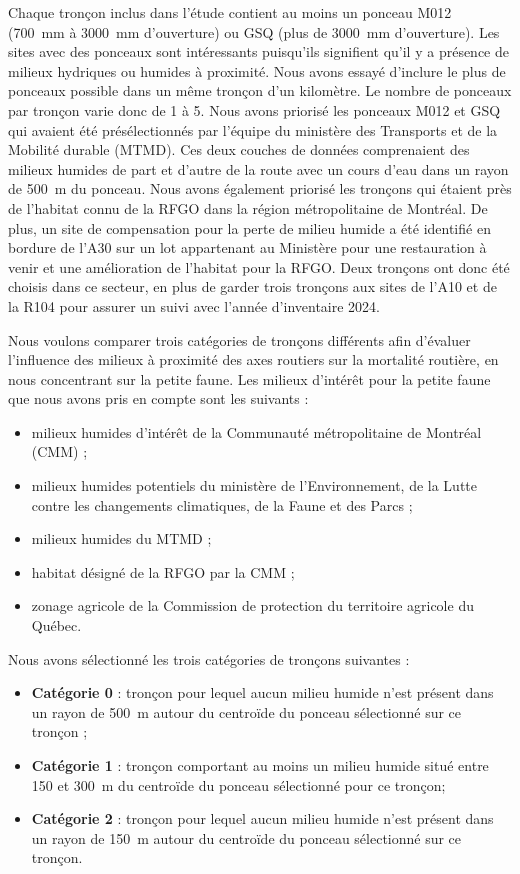 Chaque tronçon inclus dans l'étude contient au moins un ponceau M012 (700~mm à
3000~mm d'ouverture) ou GSQ (plus de 3000~mm d'ouverture). Les sites avec des
ponceaux sont intéressants puisqu'ils signifient qu'il y a présence de milieux
hydriques ou humides à proximité. Nous avons essayé d'inclure le plus de ponceaux
possible dans un même tronçon d'un kilomètre. Le nombre de ponceaux par tronçon
varie donc de 1 à 5. Nous avons priorisé les ponceaux M012 et GSQ qui avaient été
présélectionnés par l'équipe du ministère des Transports et de la Mobilité durable
(MTMD). Ces deux couches de données
comprenaient des milieux humides de part et d'autre de la route avec un cours d'eau
dans un rayon de 500~m du ponceau. Nous avons également priorisé les tronçons qui
étaient près de l'habitat connu de la RFGO dans la région métropolitaine de
Montréal. De plus, un site de compensation pour la perte de milieu humide a été
identifié en bordure de l'A30 sur un lot appartenant au Ministère pour une
restauration à venir et une amélioration de l'habitat pour la RFGO. Deux tronçons
ont donc été choisis dans ce secteur, en plus de garder trois tronçons aux sites de
l'A10 et de la R104 pour assurer un suivi avec l'année d'inventaire 2024.

Nous voulons comparer trois catégories de tronçons différents afin d'évaluer l'influence des milieux à proximité des axes routiers sur la mortalité routière, en nous concentrant sur la petite faune. Les milieux d'intérêt pour la petite faune que nous avons pris en compte sont les suivants :

\begin{itemize}
  \item milieux humides d'intérêt de la Communauté métropolitaine de Montréal
        (CMM) ;
  \item milieux humides potentiels du ministère de l'Environnement, de la Lutte
        contre les changements climatiques, de la Faune et des Parcs ;
  \item milieux humides du MTMD ;
  \item habitat désigné de la RFGO par la CMM ;
  \item zonage agricole de la Commission de protection du territoire agricole du
        Québec.
\end{itemize}

Nous avons sélectionné les trois catégories de tronçons suivantes :

\begin{itemize}
  \item \textbf{Catégorie 0} : tronçon pour lequel aucun milieu humide n’est présent dans un rayon de 500~m autour du centroïde du ponceau sélectionné sur ce tronçon ;
  \item \textbf{Catégorie 1} : tronçon comportant au moins un milieu humide situé entre 150 et 300~m du centroïde du ponceau sélectionné pour ce tronçon;
  \item \textbf{Catégorie 2} :  tronçon pour lequel aucun milieu humide n’est présent dans un rayon de 150~m autour du centroïde du ponceau sélectionné sur ce tronçon.
\end{itemize}


